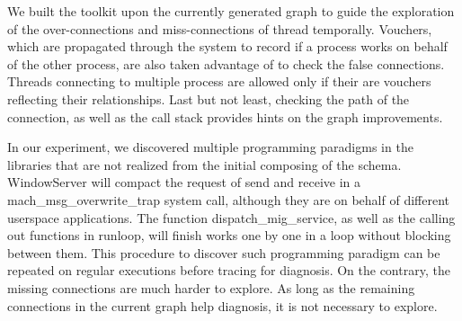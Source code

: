 We built the toolkit upon the currently generated graph to guide the exploration of the over-connections and miss-connections of thread temporally.
Vouchers, which are propagated through the system to record if a process works on behalf of the other process, are also taken advantage of to check the false connections.
Threads connecting to multiple process are allowed only if their are vouchers reflecting their relationships.
Last but not least, checking the path of the connection, as well as the call stack provides hints on the graph improvements.

In our experiment, we discovered multiple programming paradigms in the libraries that are not realized from the initial composing of the schema.
WindowServer will compact the request of send and receive in a mach\_msg\_overwrite\_trap system call, although they are on behalf of different userspace applications.
The function dispatch\_mig\_service, as well as the calling out functions in runloop, will finish works one by one in a loop without blocking between them.
This procedure to discover such programming paradigm can be repeated on regular executions before tracing for diagnosis.
On the contrary, the missing connections are much harder to explore.
As long as the remaining connections in the current graph help diagnosis, it is not necessary to explore.
